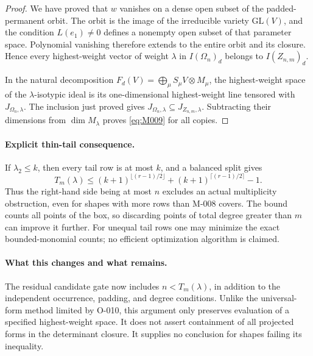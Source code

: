 \begin{proof}
We have proved that \(w\) vanishes on a dense open subset of the
padded-permanent orbit. The orbit is the image of the irreducible
variety \(\mathrm{GL}(V)\), and the condition \(L(e_1)\ne0\)
defines a nonempty open subset of that parameter space. Polynomial
vanishing therefore extends to the entire orbit and its closure.
Hence every highest-weight vector of weight \(\lambda\) in
\(I(\Omega_n)_d\) belongs to \(I(Z_{n,m})_d\).

In the natural decomposition
\(F_d(V)=\bigoplus_\mu S_\mu V\otimes M_\mu\),
the highest-weight space of the \(\lambda\)-isotypic ideal
is its one-dimensional highest-weight line tensored with
\(J_{\Omega_n,\lambda}\). The inclusion just proved gives
\(J_{\Omega_n,\lambda}\subseteq J_{Z_{n,m},\lambda}\).
Subtracting their dimensions from \(\dim M_\lambda\) proves
\eqref{eq:M009} for all copies.
\end{proof}

\paragraph{Explicit thin-tail consequence.}
If \(\lambda_2\leq k\), then every tail row is at most \(k\),
and a balanced split gives
\[
 T_m(\lambda)\leq
  (k+1)^{\lfloor(r-1)/2\rfloor}
       +(k+1)^{\lceil(r-1)/2\rceil}-1.
\]
Thus the right-hand side being at most \(n\) excludes an actual
multiplicity obstruction, even for shapes with more rows than
M-008 covers. The bound counts all points of the box, so discarding
points of total degree greater than \(m\) can improve it further.
For unequal tail rows one may minimize the exact bounded-monomial
counts; no efficient optimization algorithm is claimed.

\paragraph{What this changes and what remains.}
The residual candidate gate now includes \(n<T_m(\lambda)\),
in addition to the independent occurrence, padding, and degree
conditions. Unlike the universal-form method limited by O-010,
this argument only preserves evaluation of a specified highest-weight
space. It does not assert containment of all projected forms in
the determinant closure. It supplies no conclusion for shapes
failing its inequality.

